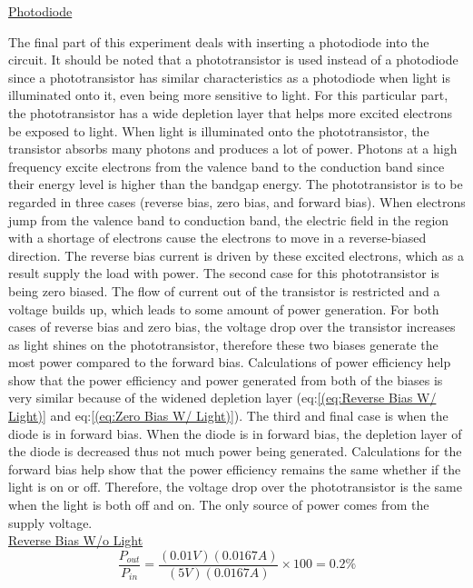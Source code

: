 \underline{Photodiode}

The final part of this experiment deals with inserting a photodiode into the circuit. It should be noted that a phototransistor is used instead of a photodiode since a  phototransistor has similar characteristics as a photodiode when light is illuminated onto it, even being more sensitive to light. For this particular part, the phototransistor has a wide depletion layer that helps more excited electrons be exposed to light. When light is illuminated onto the phototransistor, the transistor absorbs many photons and produces a lot of power. Photons at a high frequency excite electrons from the valence band to the conduction band since their energy level is higher than the bandgap energy. The phototransistor is to be regarded in three cases (reverse bias, zero bias, and forward bias). When electrons jump from the valence band to conduction band, the electric field in the region with a shortage of electrons cause the electrons to move in a reverse-biased direction. The reverse bias current is driven by these excited electrons, which as a result supply the load with power. The second case for this phototransistor is being zero biased. The flow of current out of the transistor is restricted and a voltage builds up, which leads to some amount of power generation. For both cases of reverse bias and zero bias, the voltage drop over the transistor increases as light shines on the phototransistor, therefore these two biases generate the most power compared to the forward bias. Calculations of power efficiency help show that the power efficiency and power generated from both of the biases is very similar because of the widened depletion layer (eq:\ref{(eq:Reverse Bias W/ Light)} and eq:\ref{(eq:Zero Bias W/ Light)}). The third and final case is when the diode is in forward bias. When the diode is in forward bias, the depletion layer of the diode is decreased thus not much power being generated. Calculations for the forward bias help show that the power efficiency remains the same whether if the light is on or off. Therefore, the voltage drop over the phototransistor is the same when the light is both off and on. The only source of power comes from the supply voltage. \\

\underline{Reverse Bias W/o Light}\\
\begin{equation}
\label{eq:Reverse Bias W/o Light}
\frac{P_{out}}{P_{in}} = \frac{(0.01V)(0.0167A)}{(5V)(0.0167A)} \times 100 = 0.2\%
\end{equation}

